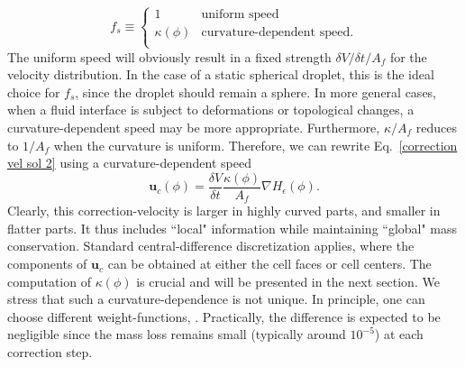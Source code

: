 \begin{equation}
    f_s \equiv
    \begin{cases}
        1            & \textrm{uniform speed} \\
        \kappa(\phi) & \textrm{curvature-dependent speed}. \\
    \end{cases}
    \label{speed func}
\end{equation}
The uniform speed will obviously result in a fixed strength $\delta V/\delta t /A_f$ for the velocity distribution. In the case of a static spherical droplet, this is the ideal choice for $f_s$, since the droplet should remain a sphere. In more general cases, when a fluid interface is subject to deformations or topological changes, a curvature-dependent speed may be more appropriate.  Furthermore, $\kappa/A_f$ reduces to $1/A_f$ when the curvature is uniform. Therefore, we can rewrite Eq.\ \eqref{correction vel sol 2} using a curvature-dependent speed
\begin{equation}
    {\bm u}_c(\phi) = \frac{\delta V}{\delta t} \frac{\kappa(\phi)}{A_f} \nabla H_\epsilon(\phi).
  \label{correction vel sol *}
\end{equation}
Clearly, this correction-velocity is larger in highly curved parts, and smaller in flatter parts. It thus includes ``local" information while maintaining ``global" mass conservation. Standard central-difference discretization applies, where the components of ${\bm u}_c$ can be obtained at either the cell faces or cell centers. The computation of $\kappa(\phi)$ is crucial and will be presented in the next section. We stress that such a curvature-dependence is not unique. In principle, one can choose different weight-functions, . Practically, the difference is expected to be negligible since the mass loss remains small (typically around $10^{-5}$) at each correction step.

